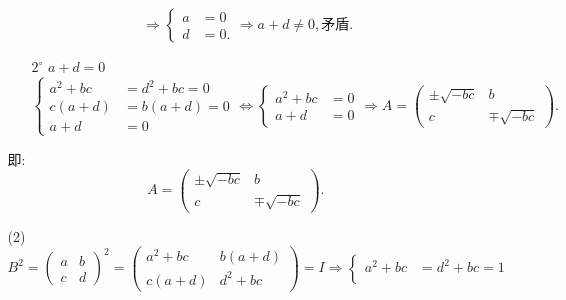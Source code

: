 \documentclass{article}
\begin{document}
\begin{enumerate}
\begin{enumerate}
\begin{enumerate}
\[                    \Rightarrow
                    \begin{cases}
                        a&=0\\
                        d&=0.
                    \end{cases}
                    \Rightarrow
                    a+d\neq 0,\mbox{矛盾.}
                \]
                \item [$2^\circ$]$a+d=0$
                \[
                    \begin{cases}
                        a^2+bc&=d^2+bc=0\\
                        c(a+d)&=b(a+d)=0\\
                        a+d&=0
                    \end{cases}
                    \Leftrightarrow
                    \begin{cases}
                        a^2+bc&=0\\
                        a+d&=0
                    \end{cases}
                    \Rightarrow
                    A=
                    \begin{pmatrix}
                        \pm\sqrt{-bc} & b\\
                        c & \mp\sqrt{-bc} 
                    \end{pmatrix}.
                \]
            \end{enumerate}
            即:
            \[
                A=
                \begin{pmatrix}
                    \pm\sqrt{-bc} & b\\
                    c & \mp\sqrt{-bc} 
                \end{pmatrix}.    
            \]
            \item [(2)]
            \[
                B^2=
                {\begin{pmatrix}
                    a& b\\
                    c& d
                \end{pmatrix}}^2
                =
                \begin{pmatrix}
                    a^2+bc& b(a+d)\\
                    c(a+d)& d^2+bc
                \end{pmatrix}
                =I
                \Rightarrow
                \begin{cases}
                    a^2+bc&=d^2+bc=1\\

\end{cases}\]
\end{enumerate}
\end{enumerate}
\end{document}

